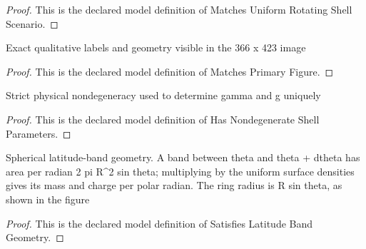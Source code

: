 \begin{proof}
  This is the declared model definition of Matches Uniform Rotating Shell Scenario.
\end{proof}
\begin{definition}
  \label{def:physics:phyx-mini-0970:phyxminiproblems-problemphyxmini0970-matchesprimaryfigure}
  Exact qualitative labels and geometry visible in the 366 x 423 image
\end{definition}
\begin{proof}
  This is the declared model definition of Matches Primary Figure.
\end{proof}
\begin{definition}
  \label{def:physics:phyx-mini-0970:phyxminiproblems-problemphyxmini0970-hasnondegenerateshellparameters}
  Strict physical nondegeneracy used to determine gamma and g uniquely
\end{definition}
\begin{proof}
  This is the declared model definition of Has Nondegenerate Shell Parameters.
\end{proof}
\begin{definition}
  \label{def:physics:phyx-mini-0970:phyxminiproblems-problemphyxmini0970-satisfieslatitudebandgeometry}
  Spherical latitude-band geometry. A band between theta and theta + dtheta has area per radian 2 pi R\textasciicircum{}2 sin theta; multiplying by the uniform surface densities gives its mass and charge per polar radian. The ring radius is R sin theta, as shown in the figure
\end{definition}
\begin{proof}
  This is the declared model definition of Satisfies Latitude Band Geometry.
\end{proof}
